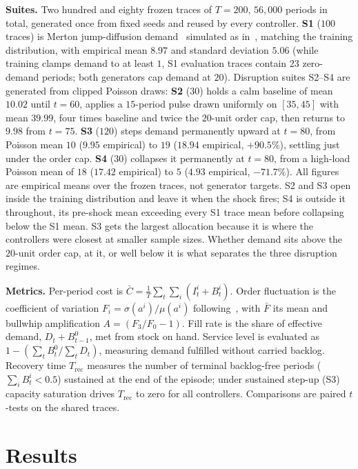 \documentclass[conference]{IEEEtran}
\begin{document}
\textbf{Suites.} Two hundred and eighty frozen traces of $T=200$, $56{,}000$
periods in total, generated once from fixed seeds and reused by every
controller. \textbf{S1} ($100$ traces) is Merton jump-diffusion
demand~\cite{merton1976} simulated as in~\cite{glasserman2004}, matching the
training distribution, with empirical mean $8.97$ and standard deviation
$5.06$ (while training clamps demand to at least $1$, S1 evaluation traces
contain $23$ zero-demand periods; both generators cap demand at $20$).
Disruption suites S2--S4 are generated from clipped Poisson draws:
\textbf{S2} ($30$) holds a calm baseline of mean
$10.02$ until $t=60$, applies a $15$-period pulse drawn uniformly on
$[35,45]$ with mean $39.99$, four times baseline and twice the $20$-unit
order cap, then returns to $9.98$ from $t=75$. \textbf{S3} ($120$) steps
demand permanently upward at $t=80$, from Poisson mean $10$ ($9.95$ empirical)
to $19$ ($18.94$ empirical, $+90.5\%$), settling just under the order cap.
\textbf{S4} ($30$) collapses it permanently at $t=80$, from a high-load Poisson
mean of $18$ ($17.42$ empirical) to $5$ ($4.93$ empirical, $-71.7\%$).
All figures are empirical means over the frozen traces,
not generator targets. S2 and S3 open inside the training distribution and
leave it when the shock fires; S4 is outside it throughout, its pre-shock
mean exceeding every S1 trace mean before collapsing below the S1 mean. S3
gets the largest allocation because it is where the controllers were closest
at smaller sample sizes. Whether demand sits above the $20$-unit order cap,
at it, or well below it is what separates the three disruption regimes.

\textbf{Metrics.} Per-period cost is
$\bar C = \tfrac{1}{T}\sum_t \sum_i (I_t^i + B_t^i)$. Order fluctuation is
the coefficient of variation $F_i = \sigma(a^i)/\mu(a^i)$
following~\cite{fransoo2000}, with $\bar F$ its mean and bullwhip
amplification $A = (F_3/F_0 - 1)$. Fill rate is the share of effective
demand, $D_t + B_{t-1}^0$, met from stock on hand. Service level is evaluated
as $1 - (\sum_t B_t^0 / \sum_t D_t)$, measuring demand fulfilled without
carried backlog. Recovery time $T_{\text{rec}}$ measures the number of terminal
backlog-free periods ($\sum_i B_t^i < 0.5$) sustained at the end of the episode;
under sustained step-up (S3) capacity saturation drives $T_{\text{rec}}$ to zero for
all controllers. Comparisons are paired $t$-tests on the shared traces.

\section{Results}
\end{document}
